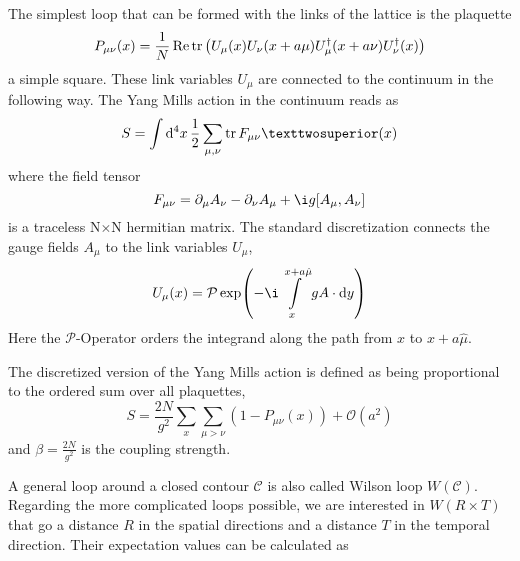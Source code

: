 \documentclass[%
 reprint,
 amsmath,amssymb,
 aps,
]{revtex4-1}
\renewcommand{\Re}{\operatorname{Re}}
\begin{document}
The simplest loop that can be formed with the links of the lattice is the plaquette \[P_{\mu\nu}(x)=\frac{1}{N}\Re\tr\left(U_\mu(x)U_\nu(x+a\mu)U_\mu^\dagger(x+a\nu)U^\dagger_\nu(x)\right)\] a simple square. These link variables $U_\mu$ are connected to the continuum in the following way. The Yang Mills action in the continuum reads as \[S=\int\dd{^4x}\dfrac{1}{2}\sum\limits_{\mu,\nu}\tr F_{\mu\nu}²(x)\] where the field tensor\[F_{\mu\nu}=\partial_\mu A_\nu-\partial_\nu A_\mu+\i g [A_\mu,A_\nu]\] is a traceless N$\times$N hermitian matrix. The standard discretization connects the gauge fields $A_\mu$ to the link variables $U_\mu$, \[U_\mu(x)=\mathcal{P}\exp(-\i\int\limits_{x}^{x+a\hat{\mu}}g A\cdot\dd{y})\]
Here the $\mathcal{P}$-Operator orders the integrand along the path from $x$ to $x+a\hat{\mu}$.

The discretized version of the Yang Mills action is defined as being proportional to the ordered sum over all plaquettes, \[S=\frac{2N}{g^2}\sum_{x}\sum_{\mu>\nu}\left(1-P_{\mu\nu}(x)\right)+\mathcal{O}(a^2)\]
and $\beta=\frac{2N}{g^2}$ is the coupling strength. 


%
%


A general loop around a closed contour $\mathcal{C}$ is also called Wilson loop $W(\mathcal{C})$. Regarding the more complicated loops possible, we are interested in $W(R\times T)$ that go a distance $R$ in the spatial directions and a distance $T$ in the temporal direction. Their expectation values can be calculated as 
\end{document}
